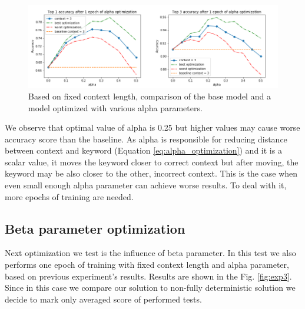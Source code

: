 \documentclass{llncs}
\begin{document}
\begin{figure}
    \label{fig:exp2}
    \caption{Based on fixed context length, comparison of the base model and a model optimized with various alpha parameters. }
    \includegraphics[scale=0.6]{res/exp2_alpha_top_acc.png}
\end{figure}

We observe that optimal value of alpha is 0.25 but higher values may cause worse accuracy score than the baseline. As alpha is responsible for reducing distance between context and keyword (Equation \ref{eq:alpha_optimization}) and it is a scalar value, it moves the keyword closer to correct context but after moving, the keyword may be also closer to the other, incorrect context.
This is the case when even small enough alpha parameter can achieve worse results. To deal with it, more epochs of training are needed.

\subsection{Beta parameter optimization}
Next optimization we test is the influence of beta parameter. In this test we also performs one epoch of training with fixed context length and alpha parameter, based on previous experiment's results. Results are shown in the Fig. \ref{fig:exp3}. Since in this case we compare our solution to non-fully deterministic solution we decide to mark only averaged score of performed tests.
\end{document}
